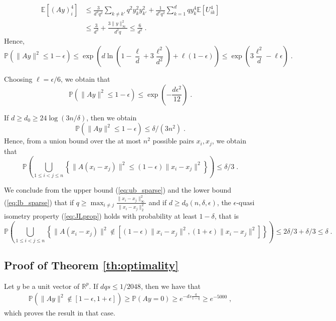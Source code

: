 \documentclass{ps}
\def\R{\mathbb{R}}
\renewcommand{\P}{\mathbb{P}}
\newcommand{\E}{\mathbb{E}}
\newcommand{\1}{\mathbbm{1}}
\theoremstyle{plain}
\begin{document}
\begin{align*}
	\E[(Ay)_i^4] &\leq \frac{3}{d^2q^2} \sum_{k\neq k'} q^2 y_k^2y_{k'}^2 + \frac{1}{d^2q^2} \sum_{k=1}^d qy_k^4 \E[U_{ik}^4]\\
	&\leq \frac{3}{d^2} + \frac{3\|y\|_{\infty}^2}{d^2q} \leq \frac{6}{d^2} \; .
\end{align*}
Hence,
\[\P\left(\|Ay\|^2\leq 1-\epsilon\right) \leq  \exp \left(d \ln\left(1 - \frac{\ell}{d} + 3\frac{\ell^2}{d^2}\right) + \ell ( 1-\epsilon)\right) \leq \exp \left( 3 \frac{\ell^2}{d} - \ell \epsilon\right)
\;.\] 

Choosing $\ell = \epsilon/6$, we obtain that
\begin{equation*}
	\P(\|Ay\|^2 \leq 1- \epsilon) \leq \exp(-\frac{d\epsilon^2}{12}) \; .
\end{equation*}

If $d \geq d_0 \geq 24 \log(3n/\delta)$, then we obtain 
\begin{equation*}
	\P(\|Ay\|^2 \leq 1- \epsilon) \leq \delta/(3n^2) \; .
\end{equation*}
Hence, from a union bound over the at most $n^2$ possible pairs $x_i, x_j$, we obtain that 
\begin{equation}\label{eq:lb_sparse}
	\P\left( \bigcup_{1\leq i<j\leq n} \left\{ \big\|A(x_i-x_j)\big\|^2 \leq (1- \epsilon)\|x_i-x_j\|^2 \right\}  \right) \leq \delta/3\;.
\end{equation}


We conclude from the upper bound (\ref{eq:ub_sparse}) and the lower bound (\ref{eq:lb_sparse}) that if $q \geq \max_{i\neq j}\frac{\|x_i - x_j\|^2_{\infty}}{\|x_i - x_j\|_2^2}$ and if $d \geq d_0(n,\delta, \epsilon)$, the $\epsilon$-quasi isometry property (\ref{eq:JLprop}) holds with probability at least $1-\delta$, that is
\[\P\left( \bigcup_{1\leq i<j\leq n} \left\{ \big\|A(x_i-x_j)\big\|^2 \notin \left[ (1-\epsilon)\|x_i-x_j\|^2  ,  (1+\epsilon)\|x_i-x_j\|^2  \right] \right\}  \right) \leq 2\delta/3 + \delta/3 \leq \delta\;.\]

\subsection{Proof of Theorem \ref{th:optimality}}
	Let $y$ be a unit vector of $\R^p$. 
	If $dqs \leq 1/2048$, then we have that 
	\begin{align*}
		\P(\|Ay\|^2 \not \in [1-\epsilon, 1+\epsilon]) \geq \P(Ay = 0) \geq e^{-ds\tfrac{q}{1-q}} \geq e^{-5000} \; ,
	\end{align*}
	which proves the result in that case.
\end{document}
